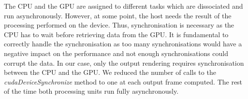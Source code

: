 The CPU and the GPU are assigned to different tasks which are dissociated and run asynchronously. However, at some point, the host needs the result of the processing performed on the device. Thus, synchronisation is necessary as the CPU has to wait before retrieving data from the GPU. It is fundamental to correctly handle the synchronisation as too many synchronisations would have a negative impact on the performance and not enough synchronisations could corrupt the data. In our case, only the output rendering requires synchronisation between the CPU and the GPU. We reduced the number of calls to the \textit{cudaDeviceSynchronize} method to one at each output frame computed. The rest of the time both processing units run fully asynchronously.